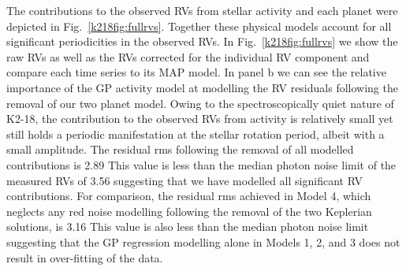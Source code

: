 The contributions to the observed RVs from stellar activity and each planet were depicted in
Fig.~\ref{k218fig:fullrvs}. Together these physical models account for all significant periodicities in the
observed RVs. In Fig.~\ref{k218fig:fullrvs} we show the raw RVs as well as the RVs corrected for the individual RV
component and compare each time series to its MAP model. In panel b we can see the relative
importance of the GP activity model at modelling the RV residuals following the removal of our
two planet model. Owing to the spectroscopically quiet nature of K2-18, the contribution to the observed
RVs from activity is relatively small yet still holds a periodic manifestation at the stellar
rotation period, albeit with a small amplitude. 
The residual rms following the removal of all modelled contributions is 2.89
 This value is less than the median photon noise limit of the measured RVs of 3.56 \mps{} suggesting that
we have modelled all significant RV contributions. For comparison, the residual rms achieved in Model 4, which
neglects any red noise modelling following the removal of the two Keplerian solutions, is 3.16  This value is
also less than the median photon noise limit suggesting that the GP regression modelling alone in Models 1, 2, and
3 does not result in over-fitting of the data.

